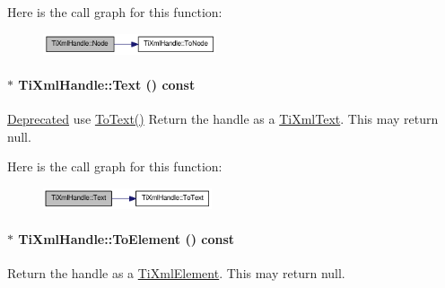 Here is the call graph for this function:\nopagebreak
\begin{figure}[H]
\begin{center}
\leavevmode
\includegraphics[width=145pt]{class_ti_xml_handle_ab44b723a8dc9af72838a303c079d0376_cgraph}
\end{center}
\end{figure}
\hypertarget{class_ti_xml_handle_a9fc739c8a18d160006f82572fc143d13}{
\paragraph[{Text}]{$\ast$ TiXmlHandle::Text () const}\hfill}
\label{class_ti_xml_handle_a9fc739c8a18d160006f82572fc143d13}
\begin{Desc}
\item[\hyperlink{deprecated__deprecated000003}{Deprecated}]use \hyperlink{class_ti_xml_handle_a4ac53a652296203a5b5e13854d923586}{ToText()} Return the handle as a \hyperlink{class_ti_xml_text}{TiXmlText}. This may return null. \end{Desc}


Here is the call graph for this function:\nopagebreak
\begin{figure}[H]
\begin{center}
\leavevmode
\includegraphics[width=141pt]{class_ti_xml_handle_a9fc739c8a18d160006f82572fc143d13_cgraph}
\end{center}
\end{figure}
\hypertarget{class_ti_xml_handle_abc6e7ed383a5fe1e52b0c0004b457b9e}{
\paragraph[{ToElement}]{$\ast$ TiXmlHandle::ToElement () const}\hfill}
\label{class_ti_xml_handle_abc6e7ed383a5fe1e52b0c0004b457b9e}
Return the handle as a \hyperlink{class_ti_xml_element}{TiXmlElement}. This may return null. 

